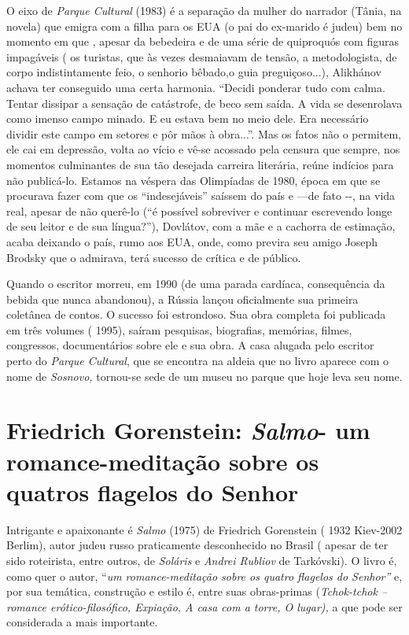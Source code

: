 O eixo de \emph{Parque Cultural} (1983) é a separação da mulher do
narrador (Tânia, na novela) que emigra com a filha para os EUA (o pai do
ex-marido é judeu) bem no momento em que , apesar da bebedeira e de uma
série de quiproquós com figuras impagáveis ( os turistas, que às vezes
desmaiavam de tensão, a metodologista, de corpo indistintamente feio, o
senhorio bêbado,o guia preguiçoso...), Alikhánov achava ter conseguido
uma certa harmonia. ``Decidi ponderar tudo com calma. Tentar dissipar a
sensação de catástrofe, de beco sem saída. A vida se desenrolava como
imenso campo minado. E eu estava bem no meio dele. Era necessário
dividir este campo em setores e pôr mãos à obra...''. Mas os fatos não o
permitem, ele cai em depressão, volta ao vício e vê-se acossado pela
censura que sempre, nos momentos culminantes de sua tão desejada
carreira literária, reúne indícios para não publicá-lo. Estamos na
véspera das Olimpíadas de 1980, época em que se procurava fazer com que
os ``indesejáveis'' saíssem do país e ---de fato -\/-, na vida real,
apesar de não querê-lo (``é possível sobreviver e continuar escrevendo
longe de seu leitor e de sua língua?''), Dovlátov, com a mãe e a
cachorra de estimação, acaba deixando o país, rumo aos EUA, onde, como
previra seu amigo Joseph Brodsky que o admirava, terá sucesso de crítica
e de público.

Quando o escritor morreu, em 1990 (de uma parada cardíaca, consequência
da bebida que nunca abandonou), a Rússia lançou oficialmente sua
primeira coletânea de contos. O sucesso foi estrondoso. Sua obra
completa foi publicada em três volumes ( 1995), saíram pesquisas,
biografias, memórias, filmes, congressos, documentários sobre ele e sua
obra. A casa alugada pelo escritor perto do \emph{Parque Cultural}, que
se encontra na aldeia que no livro aparece com o nome de \emph{Sosnovo,}
tornou-se sede de um museu no parque que hoje leva seu nome.

\chapter{Friedrich Gorenstein: \emph{Salmo}- um romance-meditação sobre os quatros flagelos do Senhor}

Intrigante e apaixonante é \emph{Salmo} (1975) de Friedrich Gorenstein (
1932 Kiev-2002 Berlim), autor judeu russo praticamente desconhecido no
Brasil ( apesar de ter sido roteirista, entre outros, de \emph{Soláris}
e \emph{Andrei Rubliov} de Tarkóvski). O livro é, como quer o autor,
``\emph{um romance-meditação sobre os quatro flagelos do Senhor''} e,
por sua temática, construção e estilo é, entre suas obras-primas
(\emph{Tchok-tchok -- romance erótico-filosófico, Expiação, A casa com a
torre, O lugar),} a que pode ser considerada a mais importante.

